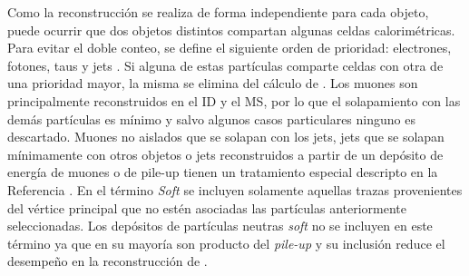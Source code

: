 Como la reconstrucción se realiza de forma independiente para cada objeto, puede ocurrir que dos objetos distintos compartan algunas celdas calorimétricas. Para evitar el doble conteo, se define el siguiente orden de prioridad: electrones, fotones, taus y jets \cite{PERF-2011-07, PERF-2014-04}. Si alguna de estas partículas comparte celdas con otra de una prioridad mayor, la misma se elimina del cálculo de \met. Los muones son principalmente reconstruidos en el ID y el MS, por lo que el solapamiento con las demás partículas es mínimo y salvo algunos casos particulares ninguno es descartado. Muones no aislados que se solapan con los jets, jets que se solapan mínimamente con otros objetos o jets reconstruidos a partir de un depósito de energía de muones o de pile-up tienen un tratamiento especial descripto en la Referencia \cite{PERF-2016-07}. En el término \textit{Soft} se incluyen solamente aquellas trazas provenientes del vértice principal que no estén asociadas las partículas anteriormente seleccionadas. Los depósitos de partículas neutras \textit{soft} no se incluyen en este término ya que en su mayoría son producto del \textit{pile-up} y su inclusión reduce el desempeño en la reconstrucción de \met.




